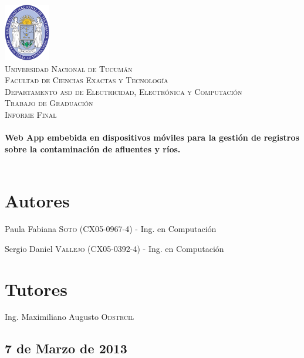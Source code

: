 \begin{titlepage}
 
\begin{center}
 
 
\includegraphics[width=0.15\textwidth]{imagenes/logo-unt.png}\\[0.5cm]
 
\textsc{\LARGE Universidad Nacional de Tucumán}\\[0.5cm]

\textsc{\normalsize Facultad de Ciencias Exactas y Tecnología}\\[0.5cm]

\textsc{\small Departamento asd de Electricidad, Electrónica y Computación}\\[1cm]
 
\textsc{\Large Trabajo de Graduación}\\[0.2cm]

\textsc{\normalsize Informe Final}\\[0.5cm]
 
 
\HRule \\[0.4cm]
{ \LARGE \bfseries Web App embebida en dispositivos móviles para la gestión de registros sobre la contaminación de afluentes y ríos.
}\\[0.4cm]
\HRule \\[0.4cm]
 
\end{center} 

\section*{Autores}
Paula Fabiana \textsc{Soto} (CX05-0967-4) - Ing. en Computación

Sergio Daniel \textsc{Vallejo} (CX05-0392-4) - Ing. en Computación

\section*{Tutores}
Ing. Maximiliano Augusto \textsc{Odstrcil}

\begin{center}
\subsection*{7 de Marzo de 2013}
\end{center}

\end{titlepage}
